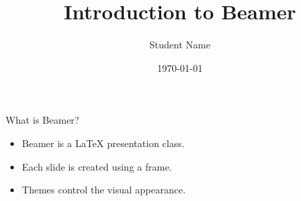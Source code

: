 \documentclass{beamer}
\title{Introduction to Beamer}
\author{Student Name}
\institute{MNIT Jaipur}
\date{\today}
\begin{document}
\begin{frame}
  \titlepage
\end{frame}

\begin{frame}{What is Beamer?}
  \begin{itemize}
    \item<1-> Beamer is a LaTeX presentation class.
    \item<2-> Each slide is created using a frame.
    \item<3-> Themes control the visual appearance.
  \end{itemize}
\end{frame}
\end{document}
